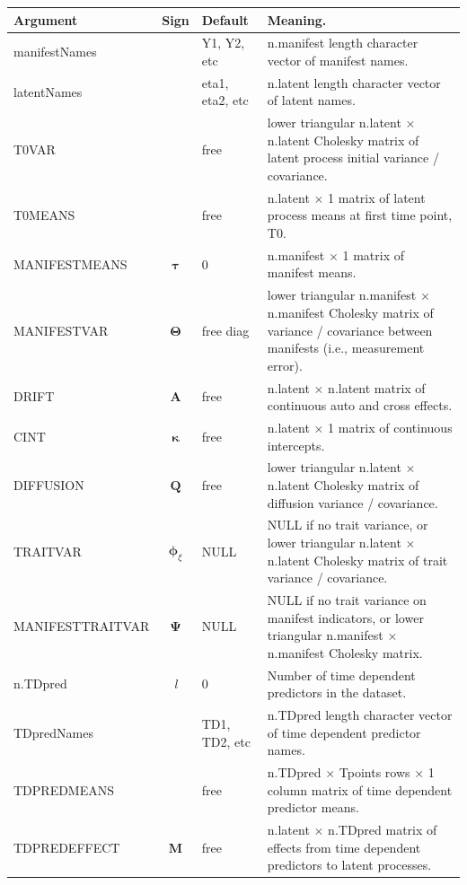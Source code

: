 \documentclass[nojss]{jss}\usepackage[]{graphicx}\usepackage[]{color}
\begin{document}
\begin{table}
\vspace{\baselineskip}
\begin{tabular}{@{}l@{}|@{}c@{}|l@{}| p{8.6cm} }
\textbf{Argument} & \textbf{Sign} & \textbf{Default} & \textbf{Meaning}.\\
\hline
manifestNames & & Y1, Y2, etc & n.manifest length character vector of manifest names.\\
latentNames & & eta1, eta2, etc & n.latent length character vector of latent names.\\
T0VAR & & free & lower triangular n.latent $\times$ n.latent Cholesky matrix of latent process initial variance / covariance.\\
T0MEANS & & free & n.latent $\times$ 1 matrix of latent process means at first time point, T0.\\
MANIFESTMEANS & $\boldsymbol{\tau}$ & 0 & n.manifest $\times$ 1 matrix of manifest means.\\
MANIFESTVAR & $\boldsymbol{\Theta}$ & free diag & lower triangular n.manifest $\times$ n.manifest Cholesky matrix of variance / covariance between manifests (i.e., measurement error).\\
DRIFT & \textbf{A} & free & n.latent $\times$ n.latent matrix of continuous auto and cross effects.\\ 
CINT & $\boldsymbol{\kappa}$ & free & n.latent $\times$ 1 matrix of continuous intercepts.\\
DIFFUSION & $\textbf{Q}$ & free & lower triangular n.latent $\times$ n.latent Cholesky matrix of diffusion variance / covariance.\\
TRAITVAR & $\boldsymbol{\phi}_{\xi}$ & NULL & NULL if no trait variance, or lower triangular n.latent $\times$ n.latent Cholesky matrix of trait variance / covariance.\\
MANIFESTTRAITVAR & $\boldsymbol{\Psi}$ & NULL & NULL if no trait variance on manifest indicators, or lower triangular n.manifest $\times$ n.manifest  Cholesky matrix.\\
n.TDpred & \textit{l} & 0 & Number of time dependent predictors in the dataset.\\
TDpredNames & & TD1, TD2, etc & n.TDpred length character vector of time dependent predictor names.\\
TDPREDMEANS & & free & n.TDpred $\times$ Tpoints rows $\times$ 1 column matrix of time dependent  predictor means.\\
TDPREDEFFECT & $\textbf{M}$ & free & n.latent $\times$ n.TDpred matrix of effects from time dependent predictors to latent processes.\\

\end{tabular}
\end{table}
\end{document}
